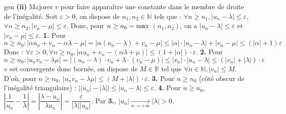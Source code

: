 \documentclass[12pt,a4paper]{report}
\begin{document}
\begin{demonstration}{gen}
\textbf{(ii)} Majorer $v$ pour faire apparaître une constante dans le membre de droite de l'inégalité.
\newline Soit $\varepsilon > 0$, on dispose de $n_1,n_2 \in \mathbb{N}$ tels que : $\forall n \geq n_1, \lvert u_n - \lambda \rvert \leq \varepsilon$, $\forall n \geq n_2, \lvert v_n - \mu \rvert \leq \varepsilon$.
\newline Donc, pour $n \geq n_0 = \rm{max}$ $(n_1,n_2)$, on a $\lvert u_n - \lambda \rvert \leq \varepsilon$ et $\lvert v_n - \mu \rvert \leq \varepsilon$.
\newline \newline \textbf{1.} Pour $n \geq n_0 : \lvert \alpha u_n + v_n - \alpha \lambda - \mu \rvert = \lvert \alpha (u_n - \lambda) + v_n - \mu \rvert \leq \lvert \alpha \rvert \cdot \lvert u_n-\lambda \rvert + \lvert v_n - \mu \rvert \leq (\lvert \alpha \rvert +1)\varepsilon$
\newline Donc : $\forall \varepsilon > 0, \forall n \geq n_0, \lvert \alpha u_n + v_n - (\alpha \lambda + \mu) \rvert \leq (1+\lvert \alpha \rvert) \cdot \varepsilon$.
\newline \newline \textbf{2.} Pour $n \geq n_0 : \lvert u_nv_n - \lambda \mu \rvert = \lvert (u_n-\lambda)\cdot v_n + \lambda \cdot (v_n - \mu) \rvert  \leq \lvert v_n \rvert \cdot \lvert u_n - \lambda \rvert \leq (\lvert v_n \rvert + \lvert \lambda \rvert) \cdot \varepsilon$
\newline $v$ est convergente donc bornée, on dispose de $M \in \mathbb{R}$ tel que $ \forall n \in \mathbb{N}, \lvert v_n \rvert \leq M$.
\newline D'où, pour $n \geq n_0$, $\lvert u_nv_n - \lambda \mu \rvert \leq (M + \lvert \lambda \rvert)\cdot \varepsilon$.
\newline \newline \textbf{3.} Pour $n \geq n_0$ (côté obscur de l'inégalité triangulaire) : $\left \lvert \lvert u_n \rvert - \lvert \lambda \rvert \right \rvert \leq \lvert u_n - \lambda \rvert \leq \varepsilon$.
\newline \newline \textbf{4.} Pour $n \geq n_0$, $\left \lvert \dfrac{1}{u_n} - \dfrac{1}{\lambda} \right \rvert  = \left \lvert \dfrac{\lambda - u_n}{\lambda u_n}\right \rvert = \dfrac{\varepsilon}{\lvert \lambda \rvert \lvert u_n \rvert}$.
\newline Par \textbf{3.}, $\lvert u_n \rvert \xrightarrow[n \rightarrow +\infty]{} \lvert \lambda \rvert > 0$.

\end{demonstration}
\end{document}

